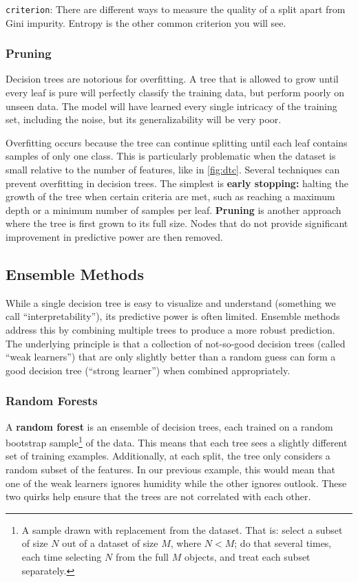 \verb|criterion|: There are different ways to measure the quality of a split apart from Gini impurity. Entropy is the other common criterion you will see.

\subsubsection*{Pruning}
Decision trees are notorious for overfitting. A tree that is allowed to grow until every leaf is pure will perfectly classify the training data, but perform poorly on unseen data. The model will have learned every single intricacy of the training set, including the noise, but its generalizability will be very poor.

Overfitting occurs because the tree can continue splitting until each leaf contains samples of only one class. This is particularly problematic when the dataset is small relative to the number of features, like in \autoref{fig:dtc}. Several techniques can prevent overfitting in decision trees. The simplest is \textbf{early stopping:} halting the growth of the tree when certain criteria are met, such as reaching a maximum depth or a minimum number of samples per leaf. \textbf{Pruning} is another approach where the tree is first grown to its full size. Nodes that do not provide significant improvement in predictive power are then removed.

\subsection*{Ensemble Methods}
While a single decision tree is easy to visualize and understand (something we call ``interpretability''), its predictive power is often limited. Ensemble methods address this by combining multiple trees to produce a more robust prediction. The underlying principle is that a collection of not-so-good decision trees (called ``weak learners'') that are only slightly better than a random guess can form a good decision tree (``strong learner'') when combined appropriately.

\subsubsection*{Random Forests}
A \textbf{random forest} is an ensemble of decision trees, each trained on a random bootstrap sample\footnote{A sample drawn with replacement from the dataset. That is: select a subset of size $N$ out of a dataset of size $M$, where $N < M$; do that several times, each time selecting $N$ from the full $M$ objects, and treat each subset separately.} of the data. This means that each tree sees a slightly different set of training examples. Additionally, at each split, the tree only considers a random subset of the features. In our previous example, this would mean that one of the weak learners ignores humidity while the other ignores outlook. These two quirks help ensure that the trees are not correlated with each other.

